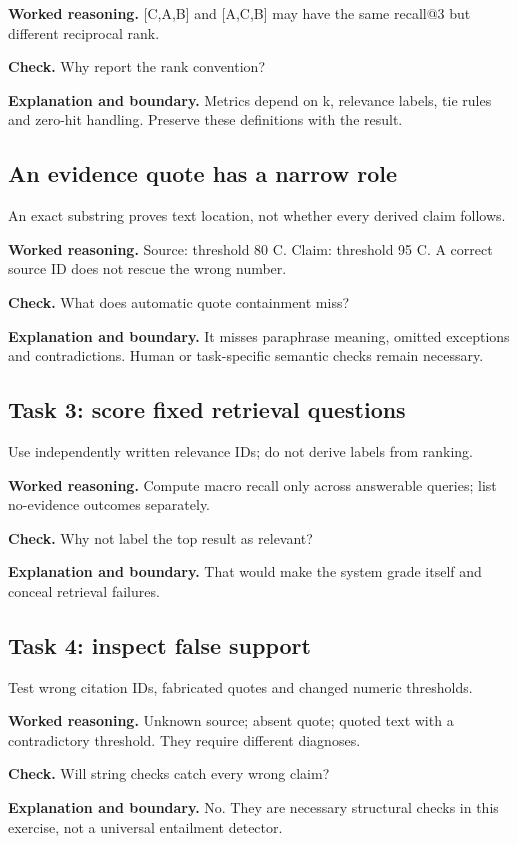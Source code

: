 \textbf{Worked reasoning.} [C,A,B] and [A,C,B] may have the same recall@3 but different reciprocal rank.

\textbf{Check.} Why report the rank convention?

\textbf{Explanation and boundary.} Metrics depend on k, relevance labels, tie rules and zero-hit handling. Preserve these definitions with the result.

\subsection{An evidence quote has a narrow role}
An exact substring proves text location, not whether every derived claim follows.

\textbf{Worked reasoning.} Source: threshold 80 C. Claim: threshold 95 C. A correct source ID does not rescue the wrong number.

\textbf{Check.} What does automatic quote containment miss?

\textbf{Explanation and boundary.} It misses paraphrase meaning, omitted exceptions and contradictions. Human or task-specific semantic checks remain necessary.

\subsection{Task 3: score fixed retrieval questions}
Use independently written relevance IDs; do not derive labels from ranking.

\textbf{Worked reasoning.} Compute macro recall only across answerable queries; list no-evidence outcomes separately.

\textbf{Check.} Why not label the top result as relevant?

\textbf{Explanation and boundary.} That would make the system grade itself and conceal retrieval failures.

\subsection{Task 4: inspect false support}
Test wrong citation IDs, fabricated quotes and changed numeric thresholds.

\textbf{Worked reasoning.} Unknown source; absent quote; quoted text with a contradictory threshold. They require different diagnoses.

\textbf{Check.} Will string checks catch every wrong claim?

\textbf{Explanation and boundary.} No. They are necessary structural checks in this exercise, not a universal entailment detector.

